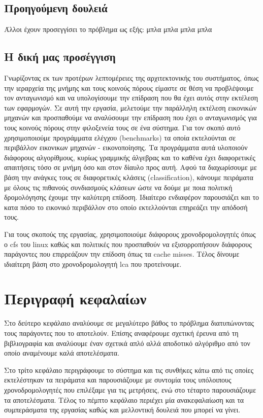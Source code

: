 \subsection{Προηγούμενη δουλειά}
Άλλοι έχουν προσεγγίσει το πρόβλημα ως εξής: μπλα μπλα μπλα μπλα

\subsection{Η δική μας προσέγγιση}
Γνωρίζοντας εκ των προτέρων λεπτομέρειες της αρχιτεκτονικής του συστήματος, όπως
την ιεραρχεία της μνήμης και τους κοινούς πόρους είμαστε σε θέση να προβλέψουμε
τον ανταγωνισμό και να υπολογίσουμε την επίδραση που θα έχει αυτός στην εκτέλεση
των εφαρμογών. Σε αυτή την εργασία, μελετούμε την παράλληλη εκτέλεση εικονικών
μηχανών και προσπαθούμε να αναλύσουμε την επίδραση που έχει ο ανταγωνισμός για
τους κοινούς πόρους στην φιλοξενεία τους σε ένα σύστημα. Για τον σκοπό αυτό
χρησιμοποιούμε προγράμματα ελέγχου (benchmarks) τα οποία εκτελούνται σε
περιβάλλον εικονικων μηχανών - εικονοποίησης. Τα προγράμματα αυτά υλοποιούν
διάφορους αλγορίθμους, κυρίως γραμμικής άλγεβρας και το καθένα έχει διαφορετικές
απαιτήσεις τόσο σε μνήμη όσο και στον δίαυλο προς αυτή. Αφού τα διαχωρίσουμε με
βάση την ανάγκες τους σε διαφορετικές κλάσεις (classification), κάνουμε
πειράματα με όλους τις πιθανούς συνδιασμούς κλάσεων ώστε να δούμε με ποια
πολιτική δρομολόγησης έχουμε την καλύτερη επίδοση. Ιδιαίτερο ενδιαφέρον
παρουσιάζει και το κατα πόσο το εικονικό περιβάλλον στο οποίο εκτελλούνται
επηρεάζει την απόδοσή τους.

Για τους σκοπούς της εργασίας, χρησιμοποιούμε διάφορους χρονοδρομολογητές όπως ο
cfs του linux καθώς και πολιτικές που προσπαθούν να εξισορροπήσουν διάφορους
παράγοντες που επιρρεάζουν την επίδοση όπως τα cache misses. Τέλος δίνουμε
ιδιαίτερη βάση στο χρονοδρομολογητή lca που προτείνουμε.

\section{Περιγραφή κεφαλαίων}
Στο δεύτερο κεφάλαιο αναλύουμε σε μεγαλύτερο βάθος το πρόβλημα διατυπώνοντας
τους παράγοντες που το αποτελούν. Επίσης αναφέρουμε σχετική έρευνα από τη
βιβλιογραφία και αναλύουμε έναν σχετικά απλό αλλά αποδοτικό αλγόριθμο από τον
οποίο αναμένουμε καλά αποτελέσματα.

Στο τρίτο κεφάλαιο περιγράφουμε το σύστημα και τις συνθήκες κάτω από τις οποίες
εκτελέστηκαν τα πειράματα και παρουσιάζουμε με συντομία τους υπόλοιπους
χρονοδρομολογητές που επιλέξαμε για τις μετρήσεις, ενώ στο τέταρτο παρουσιάζουμε
τα αποτελέσματα. Τέλος το πέμπτο κεφάλαιο περιέχει μία ανακεφαλαίωση και τα
συμπεράσματα της εργασίας καθώς και μελλοντική δουλειά που μπορεί να γίνει.
